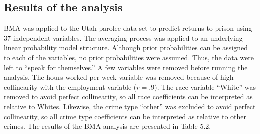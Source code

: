 \subsection{Results of the analysis}

BMA was applied to the Utah parolee data set to predict returns to prison using 37 independent variables.  The averaging process was applied to an underlying linear probability model structure.  Although prior probabilities can be assigned to each of the variables, no prior probabilities were assumed.  Thus, the data were left to ``speak for themselves.''  A few variables were removed before running the analysis. The hours worked per week variable was removed because of high collinearity with the employment variable ($r=.9$).  The race variable ``White'' was removed to avoid perfect collinearity, so all race coefficients can be interpreted as relative to Whites.  Likewise, the crime type ``other'' was excluded to avoid perfect collinearity, so all crime type coefficients can be interpreted as relative to other crimes.  The results of the BMA analysis are presented in Table 5.2.


